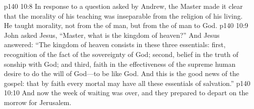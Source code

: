 \vs p140 10:8 In response to a question asked by Andrew, the Master made it clear that the morality of his teaching was inseparable from the religion of his living. He taught morality, not from the  of man, but from the  of man to God.
\pc \vs p140 10:9 John asked Jesus, “Master, what is the kingdom of heaven?” And Jesus answered: \textcolor{ubdarkred}{“The kingdom of heaven consists in these three essentials: first, recognition of the fact of the sovereignty of God; second, belief in the truth of sonship with God; and third, faith in the effectiveness of the supreme human desire to do the will of God---to be like God. And this is the good news of the gospel: that by faith every mortal may have all these essentials of salvation.”}
\pc \vs p140 10:10 And now the week of waiting was over, and they prepared to depart on the morrow for Jerusalem.
